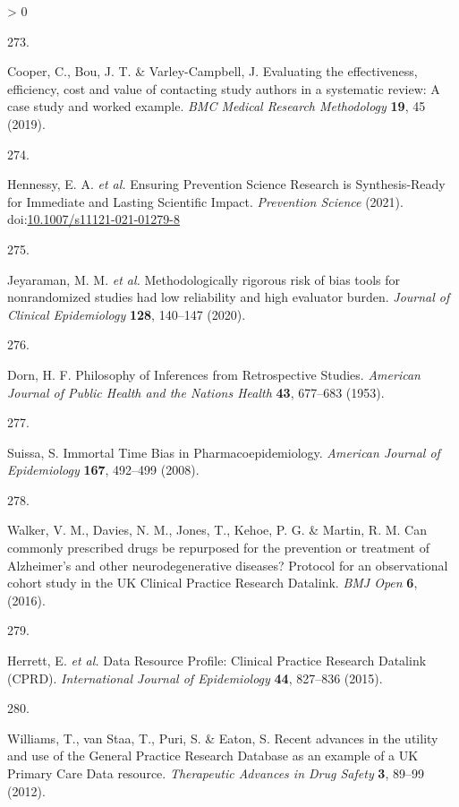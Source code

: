 \documentclass[a4paper, twoside]{templates/ociamthesis}
\newlength{\cslhangindent}
\newlength{\csllabelwidth}
\newenvironment{CSLReferences}[3] %
 {%
  \setlength{\parindent}{0pt}
  \ifodd #1 \everypar{\setlength{\hangindent}{\cslhangindent}}\ignorespaces\fi
  \ifnum #2 > 0
  \setlength{\parskip}{#2\baselineskip}
  \fi
 }%
 {}
\newcommand{\CSLLeftMargin}[1]{\parbox[t]{\maxof{\widthof{#1}}{\csllabelwidth}}{#1}}
\newcommand{\CSLRightInline}[1]{\parbox[t]{\linewidth - \csllabelwidth}{#1}}
\begin{document}
\begin{CSLReferences}{0}{0}
\leavevmode\hypertarget{ref-cooper2019}{}%
\CSLLeftMargin{273. }
\CSLRightInline{Cooper, C., Bou, J. T. \& Varley-Campbell, J. Evaluating the effectiveness, efficiency, cost and value of contacting study authors in a systematic review: A case study and worked example. \emph{BMC Medical Research Methodology} \textbf{19}, 45 (2019).}

\leavevmode\hypertarget{ref-hennessy2021}{}%
\CSLLeftMargin{274. }
\CSLRightInline{Hennessy, E. A. \emph{et al.} Ensuring {Prevention Science Research} is {Synthesis}-{Ready} for {Immediate} and {Lasting Scientific Impact}. \emph{Prevention Science} (2021). doi:\href{https://doi.org/10.1007/s11121-021-01279-8}{10.1007/s11121-021-01279-8}}

\leavevmode\hypertarget{ref-jeyaraman2020}{}%
\CSLLeftMargin{275. }
\CSLRightInline{Jeyaraman, M. M. \emph{et al.} Methodologically rigorous risk of bias tools for nonrandomized studies had low reliability and high evaluator burden. \emph{Journal of Clinical Epidemiology} \textbf{128}, 140--147 (2020).}

\leavevmode\hypertarget{ref-dorn1953}{}%
\CSLLeftMargin{276. }
\CSLRightInline{Dorn, H. F. Philosophy of {Inferences} from {Retrospective Studies}. \emph{American Journal of Public Health and the Nations Health} \textbf{43}, 677--683 (1953).}

\leavevmode\hypertarget{ref-suissa2008}{}%
\CSLLeftMargin{277. }
\CSLRightInline{Suissa, S. Immortal {Time Bias} in {Pharmacoepidemiology}. \emph{American Journal of Epidemiology} \textbf{167}, 492--499 (2008).}

\leavevmode\hypertarget{ref-walker2016}{}%
\CSLLeftMargin{278. }
\CSLRightInline{Walker, V. M., Davies, N. M., Jones, T., Kehoe, P. G. \& Martin, R. M. Can commonly prescribed drugs be repurposed for the prevention or treatment of {Alzheimer}'s and other neurodegenerative diseases? Protocol for an observational cohort study in the {UK Clinical Practice Research Datalink}. \emph{BMJ Open} \textbf{6}, (2016).}

\leavevmode\hypertarget{ref-herrett2015}{}%
\CSLLeftMargin{279. }
\CSLRightInline{Herrett, E. \emph{et al.} Data {Resource Profile}: Clinical {Practice Research Datalink} ({CPRD}). \emph{International Journal of Epidemiology} \textbf{44}, 827--836 (2015).}

\leavevmode\hypertarget{ref-williams2012}{}%
\CSLLeftMargin{280. }
\CSLRightInline{Williams, T., van Staa, T., Puri, S. \& Eaton, S. Recent advances in the utility and use of the {General Practice Research Database} as an example of a {UK Primary Care Data} resource. \emph{Therapeutic Advances in Drug Safety} \textbf{3}, 89--99 (2012).}


\end{CSLReferences}
\end{document}
